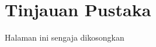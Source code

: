 \chapter{Tinjauan Pustaka}

















\newpage
\thispagestyle{empty}
\vspace*{\fill}
    \begin{center}
	Halaman ini sengaja dikosongkan
    \end{center}
\vspace*{\fill}
\pagebreak
